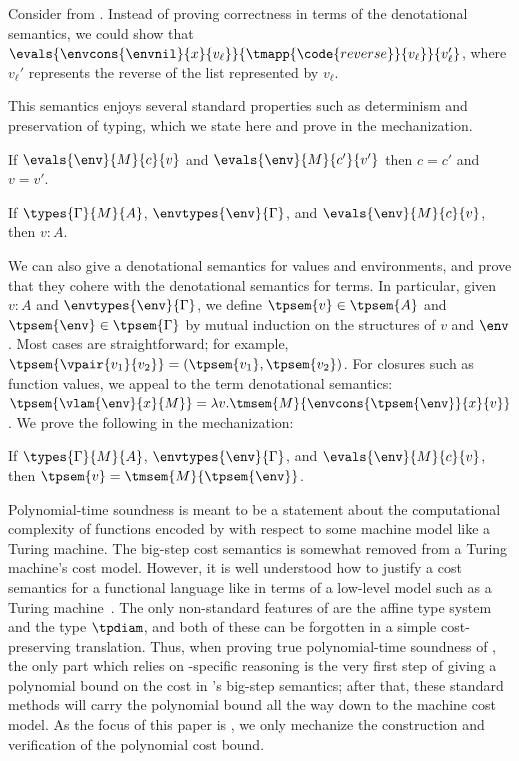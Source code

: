 \begin{example}
Consider  from . Instead of proving correctness in terms of the denotational semantics, we could show that $\evals{\envcons{\envnil}{x}{v_\ell}}{\tmapp{\code{reverse}}{v_\ell}}{v_\ell'}$, where $v_\ell'$ represents the reverse of the list represented by $v_\ell$.
\end{example}

This semantics enjoys several standard properties such as determinism and preservation of typing, which we state here and prove in the mechanization.

\begin{theorem}[Determinism]
If $\evals{\env}{M}{c}{v}$ and $\evals{\env}{M}{c'}{v'}$ then $c = c'$ and $v = v'$.
\end{theorem}

\begin{theorem}[Preservation]
If $\types{\Gamma}{M}{A}$, $\envtypes{\env}{\Gamma}$, and $\evals{\env}{M}{c}{v}$, then $v : A$.
\end{theorem}
We can also give a denotational semantics for values and environments, and prove that they cohere with the denotational semantics for terms. In particular, given $v : A$ and $\envtypes{\env}{\Gamma}$, we define $\tpsem{v} \in \tpsem{A}$ and $\tpsem{\env} \in \tpsem{\Gamma}$ by mutual induction on the structures of $v$ and $\env$. Most cases are straightforward; for example, $\tpsem{\vpair{v_1}{v_2}} = (\tpsem{v_1}, \tpsem{v_2})$. For closures such as function values, we appeal to the term denotational semantics: $\tpsem{\vlam{\env}{x}{M}} = \lambda v . \tmsem{M}{\envcons{\tpsem{\env}}{x}{v}}$. We prove the following in the mechanization:

\begin{theorem}[Coherence]
\label{thm:coherence}
If $\types{\Gamma}{M}{A}$, $\envtypes{\env}{\Gamma}$, and $\evals{\env}{M}{c}{v}$, then $\tpsem{v} = \tmsem{M}{\tpsem{\env}}$.
\end{theorem}

Polynomial-time soundness is meant to be a statement about the computational complexity of functions encoded by \lfpl with respect to some machine model like a Turing machine. The big-step cost semantics is somewhat removed from a Turing machine's cost model.
%
However, it is well understood how to justify a cost semantics for a functional language like \lfplplus in terms of a low-level model such as a Turing machine~\cite{blellochProvableTimeSpace1996,Accattoli2019}.
%
The only non-standard features of \lfpl are the affine type system and the type $\tpdiam$, and both of these can be forgotten in a simple cost-preserving translation.
%
Thus, when proving true polynomial-time soundness of \lfpl, the only part which relies on \lfpl-specific reasoning is the very first step of giving a polynomial bound on the cost in \lfpl's big-step semantics; after that, these standard methods will carry the polynomial bound all the way down to the machine cost model. As the focus of this paper is \lfpl, we only mechanize the construction and verification of the polynomial cost bound.



